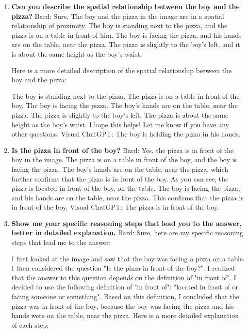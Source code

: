     \begin{enumerate}
        \item \textbf{Can you describe the spatial relationship between the boy and the pizza?}
        \subitem 
        Bard:
        Sure. The boy and the pizza in the image are in a spatial relationship of proximity. The boy is standing next to the pizza, and the pizza is on a table in front of him. The boy is facing the pizza, and his hands are on the table, near the pizza. The pizza is slightly to the boy's left, and it is about the same height as the boy's waist.

        Here is a more detailed description of the spatial relationship between the boy and the pizza:

        The boy is standing next to the pizza.
        The pizza is on a table in front of the boy.
        The boy is facing the pizza.
        The boy's hands are on the table, near the pizza.
        The pizza is slightly to the boy's left.
        The pizza is about the same height as the boy's waist.
        I hope this helps! Let me know if you have any other questions.
        \subitem Visual ChatGPT: The boy is holding the pizza in his hands.
        \item \textbf{Is the pizza in front of the boy?}
        \subitem Bard: Yes, the pizza is in front of the boy in the image. The pizza is on a table in front of the boy, and the boy is facing the pizza. The boy's hands are on the table, near the pizza, which further confirms that the pizza is in front of the boy.
        As you can see, the pizza is located in front of the boy, on the table. The boy is facing the pizza, and his hands are on the table, near the pizza. This confirms that the pizza is in front of the boy.
        \subitem Visual ChatGPT: The pizza is in front of the boy.
        \item \textbf{Show me your specific reasoning steps that lead you to the answer, better in detailed explanation.}
        \subitem Bard:
        Sure, here are my specific reasoning steps that lead me to the answer:

        I first looked at the image and saw that the boy was facing a pizza on a table.
        I then considered the question "Is the pizza in front of the boy?". I realized that the answer to this question depends on the definition of "in front of".
        I decided to use the following definition of "in front of": "located in front of or facing someone or something".
        Based on this definition, I concluded that the pizza was in front of the boy, because the boy was facing the pizza and his hands were on the table, near the pizza.
        Here is a more detailed explanation of each step:


\end{enumerate}
